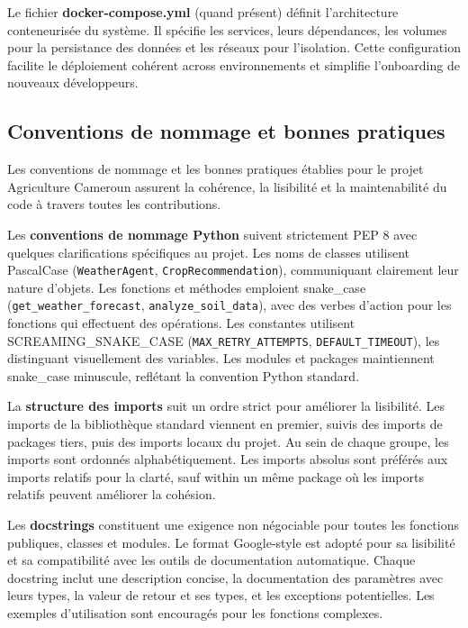 Le fichier \textbf{docker-compose.yml} (quand présent) définit l'architecture conteneurisée du système. Il spécifie les services, leurs dépendances, les volumes pour la persistance des données et les réseaux pour l'isolation. Cette configuration facilite le déploiement cohérent across environnements et simplifie l'onboarding de nouveaux développeurs.

\subsection{Conventions de nommage et bonnes pratiques}

Les conventions de nommage et les bonnes pratiques établies pour le projet Agriculture Cameroun assurent la cohérence, la lisibilité et la maintenabilité du code à travers toutes les contributions.

Les \textbf{conventions de nommage Python} suivent strictement PEP 8 avec quelques clarifications spécifiques au projet. Les noms de classes utilisent PascalCase (\texttt{WeatherAgent}, \texttt{CropRecommendation}), communiquant clairement leur nature d'objets. Les fonctions et méthodes emploient snake\_case (\texttt{get\_weather\_forecast}, \texttt{analyze\_soil\_data}), avec des verbes d'action pour les fonctions qui effectuent des opérations. Les constantes utilisent SCREAMING\_SNAKE\_CASE (\texttt{MAX\_RETRY\_ATTEMPTS}, \texttt{DEFAULT\_TIMEOUT}), les distinguant visuellement des variables. Les modules et packages maintiennent snake\_case minuscule, reflétant la convention Python standard.

La \textbf{structure des imports} suit un ordre strict pour améliorer la lisibilité. Les imports de la bibliothèque standard viennent en premier, suivis des imports de packages tiers, puis des imports locaux du projet. Au sein de chaque groupe, les imports sont ordonnés alphabétiquement. Les imports absolus sont préférés aux imports relatifs pour la clarté, sauf within un même package où les imports relatifs peuvent améliorer la cohésion.

Les \textbf{docstrings} constituent une exigence non négociable pour toutes les fonctions publiques, classes et modules. Le format Google-style est adopté pour sa lisibilité et sa compatibilité avec les outils de documentation automatique. Chaque docstring inclut une description concise, la documentation des paramètres avec leurs types, la valeur de retour et ses types, et les exceptions potentielles. Les exemples d'utilisation sont encouragés pour les fonctions complexes.

